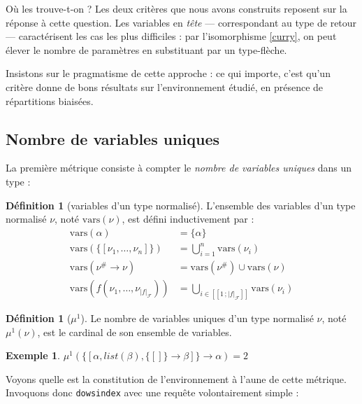 \documentclass[a4paper]{report}
\theoremstyle{definition}
\newtheorem{definition}[theoreme]{Définition}
\newtheorem{exemple}[theoreme]{Exemple}
\newcommand{\dowsindex}{\texttt{dowsindex}\xspace}
\newcommand{\interval}[2]{[\![#1\,;#2]\!]}
\newcommand{\mset}[1]{\{\![#1]\!\}}
\newcommand{\F}{\mathscr{F}}
\begin{document}
Où les trouve-t-on ? Les deux critères que nous avons construits reposent sur la réponse à cette question. Les variables en \emph{tête} — correspondant au type de retour — caractérisent les cas les plus difficiles : par l'isomorphisme \eqref{curry}, on peut élever le nombre de paramètres en substituant par un type-flèche.

Insistons sur le pragmatisme de cette approche : ce qui importe, c'est qu'un critère donne de bons résultats sur l'environnement étudié, en présence de répartitions biaisées.


\subsection{Nombre de variables uniques}

La première métrique consiste à compter le \emph{nombre de variables uniques} dans un type :

\begin{definition}[variables d'un type normalisé]
  L'ensemble des variables d'un type normalisé $\nu$, noté $\mathrm{vars} (\nu)$, est défini inductivement par :
  \begin{align*}
      \mathrm{vars} (\alpha) &=
      \{ \alpha \}
    \\
      \mathrm{vars} (\mset{\nu_1, \dots, \nu_n}) &=
      \bigcup _{i=1}^n \mathrm{vars} (\nu_i)
    \\
      \mathrm{vars} (\nu^\# \rightarrow \nu) &=
      \mathrm{vars} (\nu^\#) \cup \mathrm{vars} (\nu)
    \\
      \mathrm{vars} (f (\nu_1, \dots, \nu_{|f|_\F})) &=
      \bigcup_{i \in \interval 1 {|f|_\F}} \mathrm{vars} (\nu_i)
  \end{align*}
\end{definition}

\begin{definition}[$\mu^1$]
  Le nombre de variables uniques d'un type normalisé $\nu$, noté $\mu^1 (\nu)$, est le cardinal de son ensemble de variables.
\end{definition}

\begin{exemple}
	$\mu^1 (\mset{\alpha, list (\beta), \mset{} \rightarrow \beta} \rightarrow \alpha) = 2$
\end{exemple}

Voyons quelle est la constitution de l'environnement à l'aune de cette métrique. Invoquons donc \dowsindex avec une requête volontairement simple :
\end{document}
